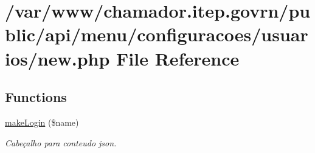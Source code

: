 \hypertarget{menu_2configuracoes_2usuarios_2new_8php}{}\section{/var/www/chamador.itep.\+govrn/public/api/menu/configuracoes/usuarios/new.php File Reference}
\label{menu_2configuracoes_2usuarios_2new_8php}
\subsection*{Functions}
\begin{DoxyCompactItemize}
\item 
\hyperlink{menu_2configuracoes_2usuarios_2new_8php_a02b1567052c09d3f736df3ae05496307}{make\+Login} (\$name)
\begin{DoxyCompactList}\small\item\em Cabeçalho para conteudo json. \end{DoxyCompactList}\end{DoxyCompactItemize}
